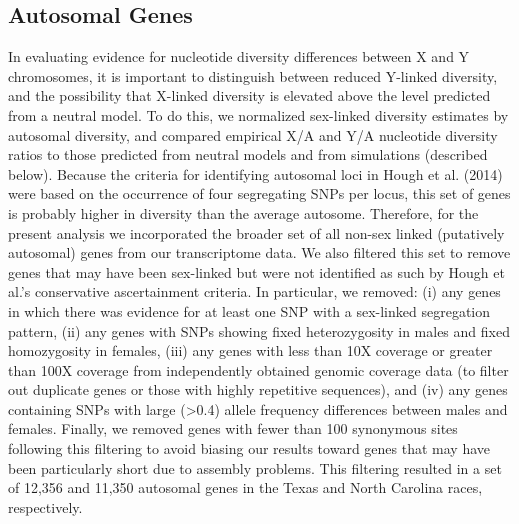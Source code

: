 \documentclass[9pt,twocolumn,twoside]{gsajnl}
\begin{document}
\subsection*{Autosomal Genes}
In evaluating evidence for nucleotide diversity differences between X and Y chromosomes, it is important to distinguish between reduced Y-linked diversity, and the possibility that X-linked diversity is elevated above the level predicted from a neutral model. To do this, we normalized sex-linked diversity estimates by autosomal diversity, and compared empirical X/A and Y/A nucleotide diversity ratios to those predicted from neutral models and from simulations (described below). Because the criteria for identifying autosomal loci in Hough et al. (2014) were based on the occurrence of four segregating SNPs per locus, this set of genes is probably higher in diversity than the average autosome. Therefore, for the present analysis we incorporated the broader set of all non-sex linked (putatively autosomal) genes from our transcriptome data. We also filtered this set to remove genes that may have been sex-linked but were not identified as such by Hough et al.'s conservative ascertainment criteria. In particular, we removed: (i) any genes in which there was evidence for at least one SNP with a sex-linked segregation pattern, (ii) any genes with SNPs showing fixed heterozygosity in males and fixed homozygosity in females, (iii) any genes with less than 10X coverage or greater than 100X coverage from independently obtained genomic coverage data (to filter out duplicate genes or those with highly repetitive sequences), and (iv) any genes containing SNPs with large (>0.4) allele frequency differences between males and females. Finally, we removed genes with fewer than 100 synonymous sites following this filtering to avoid biasing our results toward genes that may have been particularly short due to assembly problems. This filtering resulted in a set of 12,356 and 11,350 autosomal genes in the Texas and North Carolina races, respectively.
\end{document}

